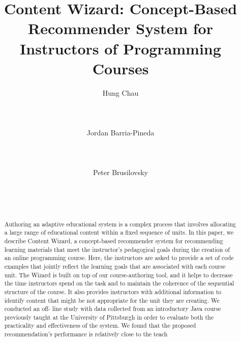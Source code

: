 \documentclass{sig-alternate}
\begin{document}
\setcounter{page}{135}
\title{Content Wizard: Concept-Based Recommender System for
Instructors of Programming Courses}


\author{
\alignauthor
Hung Chau\\
       \\
       \\
       \\
\alignauthor
Jordan Barria-Pineda\\
       \\
       \\
       \\
\alignauthor
Peter Brusilovsky\\
       \\
       \\
       \\
}
\maketitle

\begin{abstract}
Authoring an adaptive educational system is a complex process that
involves allocating a large range of educational content within a
fixed sequence of units. In this paper, we describe Content Wizard,
a concept-based recommender system for recommending learning
materials that meet the instructor’s pedagogical goals during the
creation of an online programming course. Here, the instructors
are asked to provide a set of code examples that jointly reflect the
learning goals that are associated with each course unit. The Wizard
is built on top of our course-authoring tool, and it helps to decrease
the time instructors spend on the task and to maintain the coherence
of the sequential structure of the course. It also provides instructors
with additional information to identify content that might be not
appropriate for the unit they are creating. We conducted an off-
line study with data collected from an introductory Java course
previously taught at the University of Pittsburgh in order to evaluate
both the practicality and effectiveness of the system. We found that
the proposed recommendation’s performance is relatively close to
the teach
\end{abstract}
\end{document}
